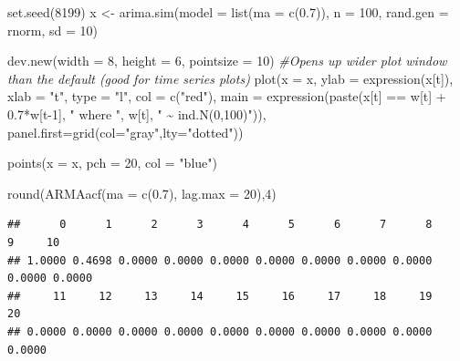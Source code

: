 \documentclass[
]{book}
\newenvironment{Shaded}{\begin{snugshade}}{\end{snugshade}}
\newcommand{\AttributeTok}[1]{\textcolor[rgb]{0.77,0.63,0.00}{#1}}
\newcommand{\CommentTok}[1]{\textcolor[rgb]{0.56,0.35,0.01}{\textit{#1}}}
\newcommand{\DecValTok}[1]{\textcolor[rgb]{0.00,0.00,0.81}{#1}}
\newcommand{\FloatTok}[1]{\textcolor[rgb]{0.00,0.00,0.81}{#1}}
\newcommand{\FunctionTok}[1]{\textcolor[rgb]{0.00,0.00,0.00}{#1}}
\newcommand{\NormalTok}[1]{#1}
\newcommand{\OtherTok}[1]{\textcolor[rgb]{0.56,0.35,0.01}{#1}}
\newcommand{\SpecialCharTok}[1]{\textcolor[rgb]{0.00,0.00,0.00}{#1}}
\newcommand{\StringTok}[1]{\textcolor[rgb]{0.31,0.60,0.02}{#1}}
\theoremstyle{definition}
\theoremstyle{definition}
\theoremstyle{definition}
\theoremstyle{definition}
\theoremstyle{remark}
\begin{document}
\begin{Shaded}
\begin{Highlighting}[]
\FunctionTok{set.seed}\NormalTok{(}\DecValTok{8199}\NormalTok{)}
\NormalTok{x }\OtherTok{\textless{}{-}} \FunctionTok{arima.sim}\NormalTok{(}\AttributeTok{model =} \FunctionTok{list}\NormalTok{(}\AttributeTok{ma =} \FunctionTok{c}\NormalTok{(}\FloatTok{0.7}\NormalTok{)), }\AttributeTok{n =} \DecValTok{100}\NormalTok{, }\AttributeTok{rand.gen =}\NormalTok{ rnorm, }\AttributeTok{sd =} \DecValTok{10}\NormalTok{)}
  
\FunctionTok{dev.new}\NormalTok{(}\AttributeTok{width =} \DecValTok{8}\NormalTok{, }\AttributeTok{height =} \DecValTok{6}\NormalTok{, }\AttributeTok{pointsize =} \DecValTok{10}\NormalTok{)  }\CommentTok{\#Opens up wider plot window than the default (good for time series plots)}
\FunctionTok{plot}\NormalTok{(}\AttributeTok{x =}\NormalTok{ x, }\AttributeTok{ylab =} \FunctionTok{expression}\NormalTok{(x[t]), }\AttributeTok{xlab =} \StringTok{"t"}\NormalTok{, }\AttributeTok{type =} \StringTok{"l"}\NormalTok{, }\AttributeTok{col =} \FunctionTok{c}\NormalTok{(}\StringTok{"red"}\NormalTok{),}
     \AttributeTok{main =} \FunctionTok{expression}\NormalTok{(}\FunctionTok{paste}\NormalTok{(x[t] }\SpecialCharTok{==}\NormalTok{ w[t] }\SpecialCharTok{+} \FloatTok{0.7}\SpecialCharTok{*}\NormalTok{w[t}\DecValTok{{-}1}\NormalTok{], }\StringTok{" where "}\NormalTok{, w[t], }
                             \StringTok{" \textasciitilde{} ind.N(0,100)"}\NormalTok{)), }
     \AttributeTok{panel.first=}\FunctionTok{grid}\NormalTok{(}\AttributeTok{col=}\StringTok{"gray"}\NormalTok{,}\AttributeTok{lty=}\StringTok{"dotted"}\NormalTok{))}

\FunctionTok{points}\NormalTok{(}\AttributeTok{x =}\NormalTok{ x, }\AttributeTok{pch =} \DecValTok{20}\NormalTok{, }\AttributeTok{col =} \StringTok{"blue"}\NormalTok{)}
\end{Highlighting}
\end{Shaded}

\begin{Shaded}
\begin{Highlighting}[]
\FunctionTok{round}\NormalTok{(}\FunctionTok{ARMAacf}\NormalTok{(}\AttributeTok{ma =} \FunctionTok{c}\NormalTok{(}\FloatTok{0.7}\NormalTok{), }\AttributeTok{lag.max =} \DecValTok{20}\NormalTok{),}\DecValTok{4}\NormalTok{)}
\end{Highlighting}
\end{Shaded}

\begin{verbatim}
##      0      1      2      3      4      5      6      7      8      9     10 
## 1.0000 0.4698 0.0000 0.0000 0.0000 0.0000 0.0000 0.0000 0.0000 0.0000 0.0000 
##     11     12     13     14     15     16     17     18     19     20 
## 0.0000 0.0000 0.0000 0.0000 0.0000 0.0000 0.0000 0.0000 0.0000 0.0000
\end{verbatim}
\end{document}
